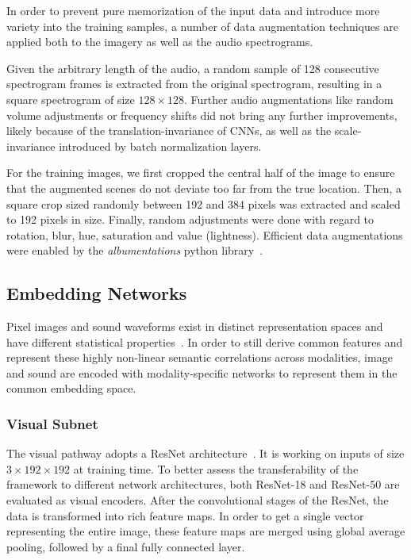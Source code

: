 \documentclass[journal]{IEEEtran}
\begin{document}
In order to prevent pure memorization of the input data and
introduce more variety into the training samples,
a number of data augmentation techniques are applied both to the
imagery as well as the audio spectrograms.

Given the arbitrary length of the audio,
a random sample of 128 consecutive spectrogram frames is extracted
from the original spectrogram, resulting in a square spectrogram of size $128 \times 128$.
Further audio augmentations like random volume adjustments or frequency shifts did not
bring any further improvements,
likely because of the translation-invariance of CNNs,
as well as the scale-invariance introduced by batch normalization layers.

For the training images,
we first cropped the central half of the image to ensure that the augmented scenes
do not deviate too far from the true location.
Then, a square crop sized randomly between 192 and 384 pixels was extracted
and scaled to 192 pixels in size.
Finally, random adjustments were done with regard to
rotation, blur, hue, saturation and value (lightness).
Efficient data augmentations were enabled by the \emph{albumentations}
python library~\cite{albumentations}.

\subsection{Embedding Networks}
Pixel images and sound waveforms exist in distinct representation spaces and have different
statistical properties~\cite{srivastava2014multimodal}.
In order to still derive common features and represent these highly non-linear
semantic correlations across modalities,
image and sound are encoded with modality-specific networks to represent them in
the common embedding space.

\subsubsection{Visual Subnet}
The visual pathway adopts a ResNet architecture~\cite{he2016deep}.
It is working on inputs of size $3 \times 192 \times 192$ at training time.
To better assess the transferability of the framework to different network architectures,
both ResNet-18 and ResNet-50 are evaluated as visual encoders.
After the convolutional stages of the ResNet,
the data is transformed into rich feature maps.
In order to get a single vector representing the entire
image, these feature maps are merged using
global average pooling,
followed by a final fully connected layer.
\end{document}
